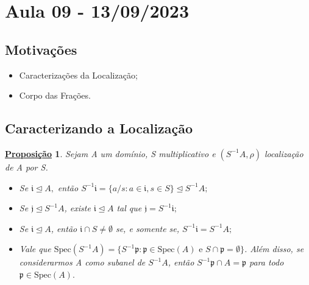 \documentclass{article}
\newtheorem*{prop*}{\underline{Proposi\c c\~ao}}
\begin{document}
    \section{Aula 09 - 13/09/2023}
    \subsection{Motivações}
    \begin{itemize}
      \item Caracterizações da Localização;
      \item Corpo das Frações.
    \end{itemize}
    \subsection{Caracterizando a Localização}
    \begin{prop*}
      Sejam A um domínio, S multiplicativo e \((S^{-1}A, \rho )\) localização de A por S.
      \begin{itemize}
        \item[1)] Se \(\mathfrak{i}\trianglelefteq{A},\) então \(S^{-1}\mathfrak{i} = \{a/s: a\in \mathfrak{i}, s\in S\}\trianglelefteq{S^{-1}A};\) 
        \item[2)] Se \(\mathfrak{j}\trianglelefteq{S^{-1}A}\), existe \(\mathfrak{i}\trianglelefteq{A}\) tal que \(\mathfrak{j} = S^{-1}\mathfrak{i};\)
        \item[3)] Se \(\mathfrak{i}\trianglelefteq{A}\), então \(\mathfrak{i}\cap S \neq\emptyset\) se, e somente se, \(S^{-1}\mathfrak{i} = S^{-1}A;\)
        \item[4)] Vale que \(\mathrm{Spec}(S^{-1}A) = \{S^{-1}\mathfrak{p}:\mathfrak{p}\in \mathrm{Spec}(A) \text{ e } S\cap \mathfrak{p}=\emptyset\}\). Além disso, se considerarmos A como subanel de \(S^{-1}A\),
          então \(S^{-1}\mathfrak{p}\cap A = \mathfrak{p}\) para todo \(\mathfrak{p}\in \mathrm{Spec}(A).\)
      \end{itemize}
    \end{prop*}
\end{document}
